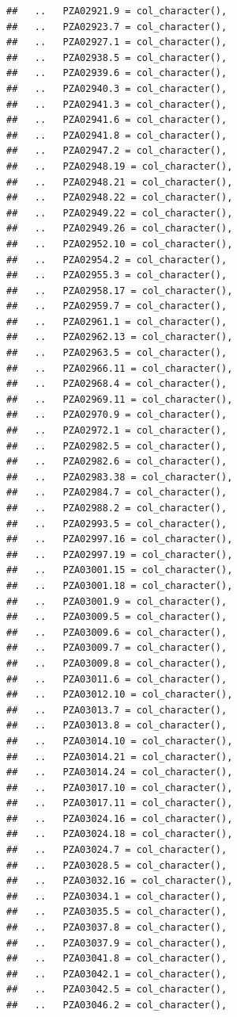 \documentclass[
]{article}
\begin{document}
\begin{verbatim}
##   ..   PZA02921.9 = col_character(),
##   ..   PZA02923.7 = col_character(),
##   ..   PZA02927.1 = col_character(),
##   ..   PZA02938.5 = col_character(),
##   ..   PZA02939.6 = col_character(),
##   ..   PZA02940.3 = col_character(),
##   ..   PZA02941.3 = col_character(),
##   ..   PZA02941.6 = col_character(),
##   ..   PZA02941.8 = col_character(),
##   ..   PZA02947.2 = col_character(),
##   ..   PZA02948.19 = col_character(),
##   ..   PZA02948.21 = col_character(),
##   ..   PZA02948.22 = col_character(),
##   ..   PZA02949.22 = col_character(),
##   ..   PZA02949.26 = col_character(),
##   ..   PZA02952.10 = col_character(),
##   ..   PZA02954.2 = col_character(),
##   ..   PZA02955.3 = col_character(),
##   ..   PZA02958.17 = col_character(),
##   ..   PZA02959.7 = col_character(),
##   ..   PZA02961.1 = col_character(),
##   ..   PZA02962.13 = col_character(),
##   ..   PZA02963.5 = col_character(),
##   ..   PZA02966.11 = col_character(),
##   ..   PZA02968.4 = col_character(),
##   ..   PZA02969.11 = col_character(),
##   ..   PZA02970.9 = col_character(),
##   ..   PZA02972.1 = col_character(),
##   ..   PZA02982.5 = col_character(),
##   ..   PZA02982.6 = col_character(),
##   ..   PZA02983.38 = col_character(),
##   ..   PZA02984.7 = col_character(),
##   ..   PZA02988.2 = col_character(),
##   ..   PZA02993.5 = col_character(),
##   ..   PZA02997.16 = col_character(),
##   ..   PZA02997.19 = col_character(),
##   ..   PZA03001.15 = col_character(),
##   ..   PZA03001.18 = col_character(),
##   ..   PZA03001.9 = col_character(),
##   ..   PZA03009.5 = col_character(),
##   ..   PZA03009.6 = col_character(),
##   ..   PZA03009.7 = col_character(),
##   ..   PZA03009.8 = col_character(),
##   ..   PZA03011.6 = col_character(),
##   ..   PZA03012.10 = col_character(),
##   ..   PZA03013.7 = col_character(),
##   ..   PZA03013.8 = col_character(),
##   ..   PZA03014.10 = col_character(),
##   ..   PZA03014.21 = col_character(),
##   ..   PZA03014.24 = col_character(),
##   ..   PZA03017.10 = col_character(),
##   ..   PZA03017.11 = col_character(),
##   ..   PZA03024.16 = col_character(),
##   ..   PZA03024.18 = col_character(),
##   ..   PZA03024.7 = col_character(),
##   ..   PZA03028.5 = col_character(),
##   ..   PZA03032.16 = col_character(),
##   ..   PZA03034.1 = col_character(),
##   ..   PZA03035.5 = col_character(),
##   ..   PZA03037.8 = col_character(),
##   ..   PZA03037.9 = col_character(),
##   ..   PZA03041.8 = col_character(),
##   ..   PZA03042.1 = col_character(),
##   ..   PZA03042.5 = col_character(),
##   ..   PZA03046.2 = col_character(),

\end{verbatim}
\end{document}
